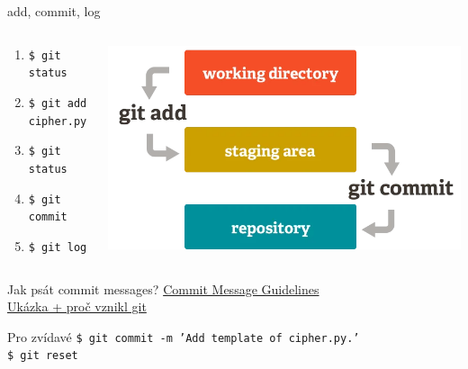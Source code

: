 \documentclass[
]{beamer}
\begin{document}
\begin{frame}{add, commit, log}
\begin{columns}[T]
\begin{column}{.48\textwidth}
\begin{enumerate}
	\item \texttt{\$ git status}
	\item \texttt{\$ git add cipher.py}
	\item \texttt{\$ git status}
	\item \texttt{\$ git commit}
	\item \texttt{\$ git log}
\end{enumerate}

\end{column}

\begin{column}{.48\textwidth}
\includegraphics[width=\textwidth]{images/lifecycle.png}
\end{column}
\end{columns}

\pause

\begin{block}{Jak psát commit messages?}
\href{https://gist.github.com/robertpainsi/b632364184e70900af4ab688decf6f53}{Commit Message Guidelines} \\
\href{https://github.com/torvalds/linux}{Ukázka + proč vznikl git}
\end{block}

\begin{block}{Pro zvídavé}
\texttt{\$ git commit -m 'Add template of cipher.py.'} \\
\texttt{\$ git reset}
\end{block}
\end{frame}
\end{document}
